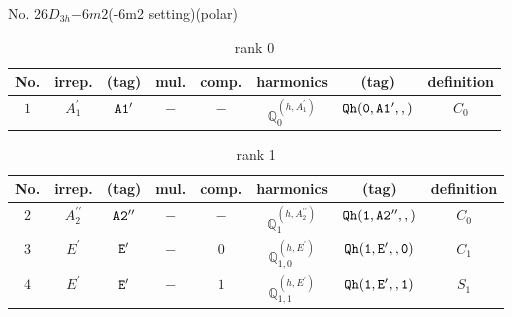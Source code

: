 \documentclass[fleqn,8pt]{jsarticle}
\begin{document}
\setcounter{MaxMatrixCols}{16}

\begin{center}
\LARGE
No. 26\quad$D_{3h}$\quad$-6m2$\quad(-6m2 setting)\quad[ hexagonal ] (polar)
\end{center}
\begin{table}[ht!]
\begin{center}
\caption{rank 0}
\renewcommand{\arraystretch}{1.3}
\begin{tabular}{cccccccc} \hline \hline
No. & irrep. & (tag) & mul. & comp. & harmonics & (tag) & definition \\ \hline
$ 1 $ & $ A_{1}^{\prime} $ & $ {\tt A1'} $ & $ - $ & $ - $ & $ \mathbb{Q}_{0}^{(h,A_{1}^{\prime})} $ & $ {\tt Qh(0,A1',,)} $ & $ C_{0} $ \\
 \hline \hline
\end{tabular}
\end{center}
\end{table}
\begin{table}[ht!]
\begin{center}
\caption{rank 1}
\renewcommand{\arraystretch}{1.3}
\begin{tabular}{cccccccc} \hline \hline
No. & irrep. & (tag) & mul. & comp. & harmonics & (tag) & definition \\ \hline
$ 2 $ & $ A_{2}^{\prime\prime} $ & $ {\tt A2''} $ & $ - $ & $ - $ & $ \mathbb{Q}_{1}^{(h,A_{2}^{\prime\prime})} $ & $ {\tt Qh(1,A2'',,)} $ & $ C_{0} $ \\
$ 3 $ & $ E^{\prime} $ & $ {\tt E'} $ & $ - $ & $ 0 $ & $ \mathbb{Q}_{1,0}^{(h,E^{\prime})} $ & $ {\tt Qh(1,E',,0)} $ & $ C_{1} $ \\
$ 4 $ & $ E^{\prime} $ & $ {\tt E'} $ & $ - $ & $ 1 $ & $ \mathbb{Q}_{1,1}^{(h,E^{\prime})} $ & $ {\tt Qh(1,E',,1)} $ & $ S_{1} $ \\
 \hline \hline
\end{tabular}
\end{center}
\end{table}
\end{document}
